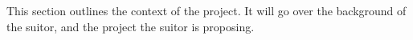 This section outlines the context of the project. It will go over the background
of the suitor, and the project the suitor is proposing.